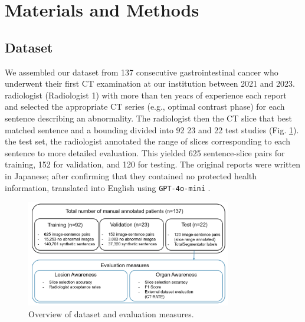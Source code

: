 \documentclass[bioengineering,article,submit,pdftex,moreauthors]{Definitions/mdpi}
\begin{document}
\section{Materials and Methods}

\subsection{Dataset}\label{sec:dataset}
We assembled our dataset from 137 consecutive gastrointestinal cancer who underwent their ﬁrst CT examination at our institution between 2021 and 2023. 
  radiologist (Radiologist 1) with more than ten years of experience  each report and selected the appropriate CT series (e.g., optimal contrast phase) for each sentence describing an abnormality. 
The radiologist then  the CT slice that best matched  sentence and  a bounding    divided into 92  23  and 22 test studies (Fig. \ref{fig:dataset_detail}). 
 the test set, the radiologist annotated the range of slices corresponding to each sentence to  more detailed evaluation. 
This yielded 625 sentence-slice pairs for training, 152 for validation, and 120 for testing. 
The original reports were written in Japanese; after confirming that they contained no protected health information,  translated into English using \texttt{GPT-4o-mini} \cite{openai_gpt-4_2024}. 


\begin{figure}[ht]
  \centering
  \includegraphics[width=0.8\textwidth]{./figures/dataset_detail_1.png}
  \caption{
     Overview of dataset  and evaluation measures.
  }
  \label{fig:dataset_detail}
\end{figure}
\end{document}
